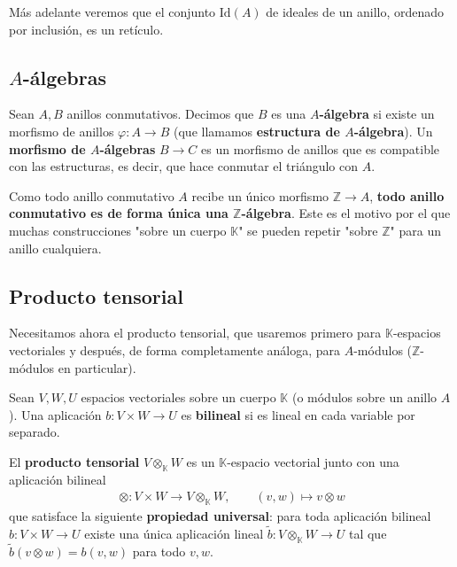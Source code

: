 Más adelante veremos que el conjunto $\mathrm{Id}(A)$ de ideales de un anillo, ordenado por inclusión, es un retículo.

\subsection{$A$-álgebras}

\begin{definicion}
Sean $A,B$ anillos conmutativos. Decimos que $B$ es una \textbf{$A$-álgebra} si existe un morfismo de anillos $\varphi:A\to B$ (que llamamos \textbf{estructura de $A$-álgebra}). Un \textbf{morfismo de $A$-álgebras} $B\to C$ es un morfismo de anillos que es compatible con las estructuras, es decir, que hace conmutar el triángulo con $A$.
\end{definicion}

Como todo anillo conmutativo $A$ recibe un único morfismo $\mathbb{Z}\to A$, \textbf{todo anillo conmutativo es de forma única una $\mathbb{Z}$-álgebra}. Este es el motivo por el que muchas construcciones "sobre un cuerpo $\mathbb{K}$" se pueden repetir "sobre $\mathbb{Z}$" para un anillo cualquiera.

\subsection{Producto tensorial}

Necesitamos ahora el producto tensorial, que usaremos primero para $\mathbb{K}$-espacios vectoriales y después, de forma completamente análoga, para $A$-módulos ($\mathbb{Z}$-módulos en particular).

\begin{definicion}
Sean $V,W,U$ espacios vectoriales sobre un cuerpo $\mathbb{K}$ (o módulos sobre un anillo $A$). Una aplicación $b:V\times W\to U$ es \textbf{bilineal} si es lineal en cada variable por separado.
\end{definicion}

\begin{definicion}
El \textbf{producto tensorial} $V\otimes_{\mathbb{K}} W$ es un $\mathbb{K}$-espacio vectorial junto con una aplicación bilineal
\begin{gather*}
    \otimes: V\times W \to V\otimes_{\mathbb{K}} W, \qquad (v,w)\mapsto v\otimes w
\end{gather*}
que satisface la siguiente \textbf{propiedad universal}: para toda aplicación bilineal $b:V\times W\to U$ existe una única aplicación lineal $\tilde b: V\otimes_{\mathbb{K}} W \to U$ tal que $\tilde b(v\otimes w)=b(v,w)$ para todo $v,w$.
\end{definicion}

